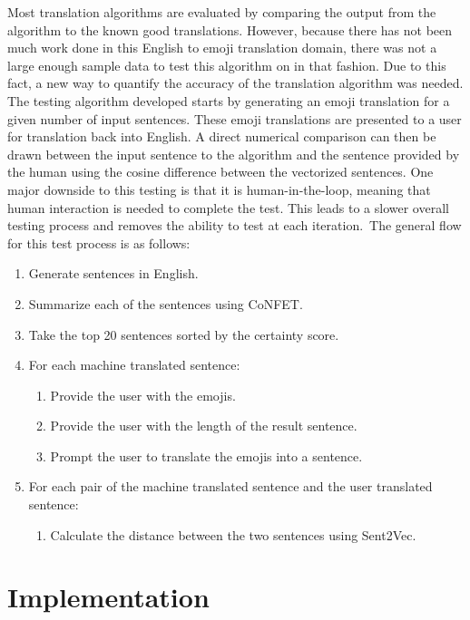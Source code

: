 \documentclass{article}[10]
\begin{document}
Most translation algorithms are evaluated by comparing the output from
the algorithm to the known good translations. However, because there has
not been much work done in this English to emoji translation domain,
there was not a large enough sample data to test this algorithm on in
that fashion. Due to this fact, a new way to quantify the accuracy of
the translation algorithm was needed. The testing algorithm developed
starts by generating an emoji translation for a given number of input
sentences. These emoji translations are presented to a user for
translation back into English. A direct numerical comparison can then be
drawn between the input sentence to the algorithm and the sentence
provided by the human using the cosine difference between the vectorized
sentences. One major downside to this testing is that it is
human-in-the-loop, meaning that human interaction is needed to complete
the test. This leads to a slower overall testing process and removes the
ability to test at each iteration.~The general flow for this test
process is as follows:

\begin{enumerate}
\item
  Generate sentences in English.
\item
  Summarize each of the sentences using CoNFET.
\item
  Take the top 20 sentences sorted by the certainty score.
\item
  {For each machine translated sentence:}
    \begin{enumerate}
        \item
          {Provide the user with the emojis.}
        \item
          {Provide the user with the length of the result sentence.}
        \item
          {Prompt the user to translate the emojis into a sentence.}
    \end{enumerate}
\item
  {For each pair of the machine translated sentence and the user
  translated sentence:}
    \begin{enumerate}
      \item
        {Calculate the distance between the two sentences using Sent2Vec.}
    \end{enumerate}
\end{enumerate}

\section{Implementation\label{sec:implementation}}
\end{document}
